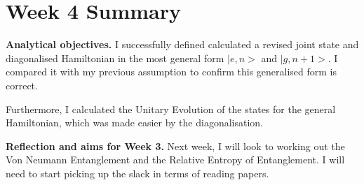 \documentclass{article}
\begin{document}
\section*{Week 4 Summary}

\vspace{0.5cm}

\textbf{Analytical objectives.} I successfully defined calculated a revised joint state and diagonalised Hamiltonian in the most general form $|e,n>$ and $|g,n+1>$. I compared it with my previous assumption to confirm this generalised form is correct. 

Furthermore, I calculated the Unitary Evolution of the states for the general Hamiltonian, which was made easier by the diagonalisation. 
    
\textbf{Reflection and aims for Week 3.} Next week, I will look to working out the Von Neumann Entanglement and the Relative Entropy of Entanglement. I will need to start picking up the slack in terms of reading papers. 
\end{document}
